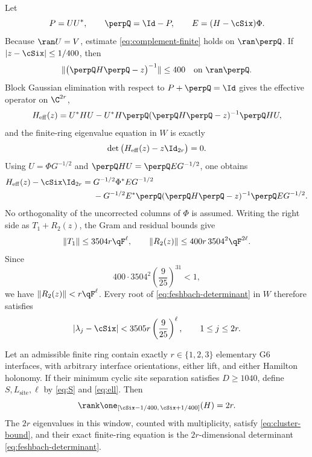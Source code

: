 Let
\begin{equation}
 P=UU^*,\qquad \perpQ=\Id-P,\qquad E=(H-\cSix)\Phi.
 \label{eq:PE}
\end{equation}
Because \(\ran U=V\), estimate \eqref{eq:complement-finite} holds on
\(\ran\perpQ\).  If \(|z-\cSix|\leq1/400\), then
\begin{equation}
 \|\big(\perpQ H\perpQ-z\big)^{-1}\|\leq400
 \quad\text{on }\ran\perpQ.
 \label{eq:resolvent}
\end{equation}
Block Gaussian elimination with respect to \(P+\perpQ=\Id\) gives the
effective operator on \(\C^{2r}\),
\begin{equation}
 H_{\mathrm{eff}}(z)=U^*HU-U^*H\perpQ
 (\perpQ H\perpQ-z)^{-1}\perpQ HU,
 \label{eq:feshbach}
\end{equation}
and the finite-ring eigenvalue equation in \(W\) is exactly
\begin{equation}
 \det\big(H_{\mathrm{eff}}(z)-z\Id_{2r}\big)=0.
 \label{eq:feshbach-determinant}
\end{equation}
Using \(U=\Phi G^{-1/2}\) and
\(\perpQ HU=\perpQ EG^{-1/2}\), one obtains
\begin{align}
 H_{\mathrm{eff}}(z)-\cSix\Id_{2r}
={}&G^{-1/2}\Phi^*EG^{-1/2} \notag\\
 &-G^{-1/2}E^*\perpQ(\perpQ H\perpQ-z)^{-1}
 \perpQ EG^{-1/2}.
 \label{eq:feshbach-expanded}
\end{align}
No orthogonality of the uncorrected columns of \(\Phi\) is assumed.
Writing the right side as \(T_1+R_2(z)\), the Gram and residual bounds give
\begin{equation}
 \|T_1\|\leq3504r\qF^\ell,\qquad
 \|R_2(z)\|\leq400r\,3504^2\qF^{2\ell}.
 \label{eq:feshbach-bounds}
\end{equation}
Since
\begin{equation}
 400\cdot3504^2\left(\frac9{25}\right)^{31}<1,
 \label{eq:remainder-numeric}
\end{equation}
we have \(\|R_2(z)\|<r\qF^\ell\).  Every root of
\eqref{eq:feshbach-determinant} in \(W\) therefore satisfies
\begin{equation}
 |\lambda_j-\cSix|<3505r\left(\frac9{25}\right)^\ell,
 \qquad 1\leq j\leq2r.
 \label{eq:cluster-bound}
\end{equation}

\begin{theorem}
\label{thm:exact-2r}
Let an admissible finite ring contain exactly \(r\in\{1,2,3\}\) elementary G6
interfaces, with arbitrary interface orientations, either lift, and either
Hamilton holonomy.  If their minimum cyclic site separation satisfies
\(D\geq1040\), define \(S,L_{\mathrm{site}},\ell\) by
\eqref{eq:S} and \eqref{eq:ell}.  Then
\[
 \rank\one_{[\cSix-1/400,\,\cSix+1/400]}(H)=2r.
\]
The \(2r\) eigenvalues in this window, counted with multiplicity, satisfy
\eqref{eq:cluster-bound}, and their exact finite-ring equation is the
\(2r\)-dimensional determinant \eqref{eq:feshbach-determinant}.
\end{theorem}

